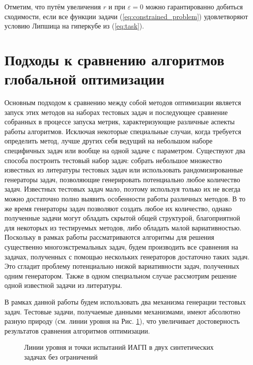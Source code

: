 Отметим, что путём увеличения \(r\) и при \(\varepsilon=0\) можно гарантированно добиться сходимости,
если все функции задачи (\ref{eq:constrained_problem}) удовлетворяют условию Липшица на гиперкубе из (\ref{eq:task}).

\section{Подходы к сравнению алгоритмов глобальной оптимизации}
\label{sec:comp_tools}
Основным подходом к сравнению между собой методов оптимизации является запуск этих методов на наборах тестовых задач
и последующее сравнение собранных в процессе запуска метрик, характеризующие различные аспекты работы алгоритмов.
Исключая некоторые специальные случаи, когда требуется определить метод, лучше других себя ведущий на небольшом наборе специфичных задач
или вообще на одной задаче с параметром. Существуют два способа построить тестовый набор задач: собрать небольшое множество
известных из литературы тестовых задач или использовать рандомизированные генераторы задач, позволяющие генерировать потенциально
любое количество задач. Известных тестовых задач мало, поэтому используя только их не всегда можно достаточно полно выявить особенности работы различных методов.
В то же время генераторы задач позволяют создать любое их количество, однако полученные задачи могут обладать скрытой общей структурой, благоприятной для
некоторых из тестируемых методов, либо обладать малой вариативностью. Поскольку в рамках работы рассматриваются алгоритмы
для решения существенно многоэкстремальных задач, будем производить все сравнения на задачах, полученных с помощью нескольких генераторов
достаточно таких задач. Это сгладит проблему потенциально низкой вариативности задач, полученных одним генератором. Также в одном специальном
случае рассмотрим решение одной известной задачи из литературы.

В рамках данной работы будем использовать два механизма генерации тестовых задач. Тестовые задачи, получаемые
данными механизмами, имеют абсолютно разную природу (см. линии уровня на Рис. \ref{fig:isolines_unconstrained}),
что увеличивает достоверность результатов сравнения алгоритмов оптимизации.

\begin{figure}[ht]
  \centering
  \caption{Линии уровня и точки испытаний ИАГП в двух синтетических задачах без ограничений}
  \label{fig:isolines_unconstrained}
\end{figure}

